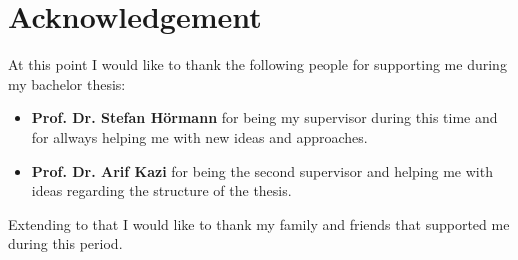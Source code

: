 \chapter*{Acknowledgement}
\label{acknowledgement}
At this point I would like to thank the following people for supporting me during my bachelor thesis:

\begin{itemize}
\item \textbf{Prof. Dr. Stefan Hörmann} for being my supervisor during this time and for allways helping me with new ideas and approaches.
\item \textbf{Prof. Dr. Arif Kazi} for being the second supervisor and helping me with ideas regarding the structure of the thesis.
\end{itemize}

Extending to that I would like to thank my family and friends that supported me during this period.

